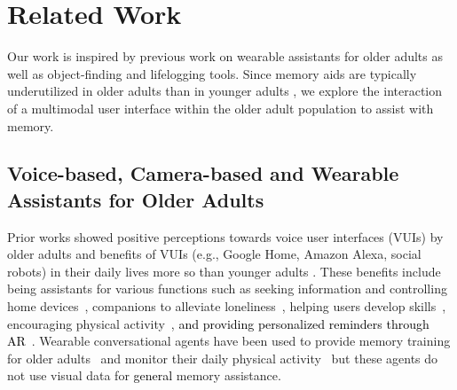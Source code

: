 \section{Related Work}
Our work is inspired by previous work on wearable assistants for older adults as well as object-finding and lifelogging tools. Since memory aids are typically underutilized in older adults than in younger adults \cite{schryer2013use}, we explore the interaction of a multimodal user interface within the older adult population to assist with memory. 

    

\subsection{Voice-based, Camera-based and Wearable Assistants for Older Adults}
\label{relatedworks_assistants}

Prior works showed positive perceptions towards voice user interfaces (VUIs) by older adults and benefits of VUIs (e.g., Google Home, Amazon Alexa, social robots) in their daily lives more so than younger adults \cite{stigall2019older}. These benefits include being assistants for various functions such as seeking information and controlling home devices~\cite{mehrotra2016embodied,opfermann2017communicative,tsiourti2014virtual,o2022optimizing}, companions to alleviate loneliness~\cite{sidner2018creating,jones2021reducing,pradhan2019phantom,corbett2021voice,gasteiger2021friends}, helping users develop skills~\cite{brewer2017xpress,ali2018aging}, encouraging physical activity~\cite{bickmore2005s}, \textcolor{black}{and providing personalized reminders through AR~\cite{10.1145/3463914.3463918}}. Wearable conversational agents have been used to provide memory training for older adults~\cite{chan2020prompto,chan2019prospero,10.1145/3334480.3375031} and monitor their daily physical activity~\cite{romanvoice} but these agents do not use visual data for \textcolor{black}{general} memory assistance. 

